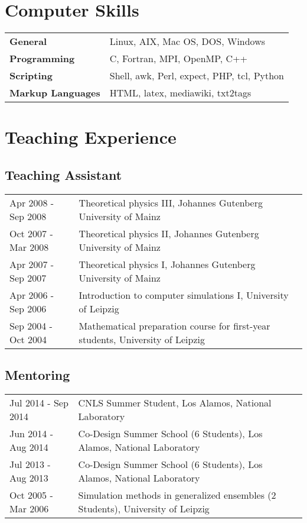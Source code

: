 \documentclass{article}
\begin{document}
\section*{Computer Skills}

\begin{tabular}{ll}
\textbf{General} & Linux, AIX, Mac OS, DOS, Windows \\
\textbf{Programming} & C, Fortran, MPI, OpenMP, C++ \\
\textbf{Scripting} & Shell, awk, Perl, expect, PHP, tcl, Python\\
\textbf{Markup Languages} & HTML, latex, mediawiki, txt2tags \\
\end{tabular}

\section*{Teaching Experience}

\subsection*{Teaching Assistant}

\begin{tabular}{p{}p{}}
Apr 2008 - Sep 2008 & Theoretical physics III, Johannes Gutenberg University of Mainz \\
Oct 2007 - Mar 2008 & Theoretical physics II, Johannes Gutenberg University of Mainz \\
Apr 2007 - Sep 2007 & Theoretical physics I, Johannes Gutenberg University of Mainz \\
Apr 2006 - Sep 2006 & Introduction to computer simulations I, University of Leipzig \\
Sep 2004 - Oct 2004 & Mathematical preparation course for first-year students, University of Leipzig \\
\end{tabular}

\subsection*{Mentoring}

\begin{tabular}{p{}p{}}
Jul 2014 - Sep 2014 & CNLS Summer Student, Los Alamos, National Laboratory \\
Jun 2014 - Aug 2014 & Co-Design Summer School (6 Students), Los Alamos, National Laboratory \\
Jul 2013 - Aug 2013 & Co-Design Summer School (6 Students), Los Alamos, National Laboratory \\
Oct 2005 - Mar 2006 & Simulation methods in generalized ensembles (2 Students), University of Leipzig \\
\end{tabular}
\end{document}
